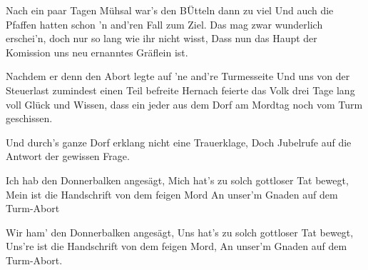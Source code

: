    \beginverse
        Nach ein paar Tagen M\"{u}hsal war's den B\"{U}tteln dann zu viel
        Und auch die Pfaffen hatten schon 'n and'ren Fall zum Ziel.
        Das mag zwar wunderlich erschei'n, doch nur so lang wie ihr nicht wisst,
        Dass nun das Haupt der Komission uns neu ernanntes Gr\"{a}flein ist.

        Nachdem er denn den Abort legte auf 'ne and're Turmesseite
        Und uns von der Steuerlast zumindest einen Teil befreite
        Hernach feierte das Volk drei Tage lang voll Gl\"{u}ck und Wissen,
        dass ein jeder aus dem Dorf am Mordtag noch vom Turm geschissen.
    \endverse

    \beginverse*
        Und durch's ganze Dorf erklang nicht eine Trauerklage,
        Doch Jubelrufe auf die Antwort der gewissen Frage.
    \endverse

    \beginchorus
        Ich hab den Donnerbalken anges\"{a}gt,
        Mich hat's zu solch gottloser Tat bewegt,
        Mein ist die Handschrift von dem feigen Mord
        An unser'm Gnaden auf dem Turm-Abort

        Wir ham' den Donnerbalken anges\"{a}gt,
        Uns hat's zu solch gottloser Tat bewegt,
        Uns're ist die Handschrift von dem feigen Mord,
        An unser'm Gnaden auf dem Turm-Abort.
    \endchorus
\endsong
